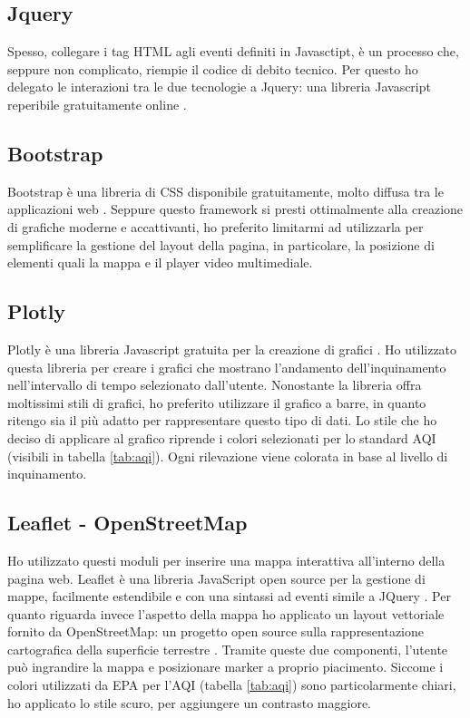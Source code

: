 \subsection{Jquery}
Spesso, collegare i tag HTML agli eventi definiti in Javasctipt, è un processo che, seppure non complicato, riempie il codice di debito tecnico.
Per questo ho delegato le interazioni tra le due tecnologie a Jquery: una libreria Javascript reperibile gratuitamente online \cite{jquery}.

\subsection{Bootstrap}
Bootstrap è una libreria di CSS disponibile gratuitamente, molto diffusa tra le applicazioni web \cite{bootstrap}.
Seppure questo framework si presti ottimalmente alla creazione di grafiche moderne e accattivanti, ho preferito limitarmi ad utilizzarla per semplificare la gestione del layout della pagina, in particolare,
la posizione di elementi quali la mappa e il player video multimediale.

\subsection{Plotly}
Plotly è una libreria Javascript gratuita per la creazione di grafici \cite{plotly}.
Ho utilizzato questa libreria per creare i grafici che mostrano l'andamento dell'inquinamento nell'intervallo di tempo selezionato dall'utente.
Nonostante la libreria offra moltissimi stili di grafici, ho preferito utilizzare il grafico a barre, in quanto ritengo sia il più adatto per rappresentare questo tipo di dati.
Lo stile che ho deciso di applicare al grafico riprende i colori selezionati per lo standard AQI (visibili in tabella \ref{tab:aqi}). Ogni rilevazione viene colorata in base al livello di inquinamento.

\subsection{Leaflet - OpenStreetMap}
Ho utilizzato questi moduli per inserire una mappa interattiva all'interno della pagina web.
Leaflet è una libreria JavaScript open source per la gestione di mappe, facilmente estendibile e con una sintassi ad eventi simile a JQuery \cite{leaflet}.
Per quanto riguarda invece l'aspetto della mappa ho applicato un layout vettoriale fornito da OpenStreetMap: un progetto open source sulla rappresentazione cartografica della superficie terrestre \cite{osm}.
Tramite queste due componenti, l'utente può ingrandire la mappa e posizionare marker a proprio piacimento.
Siccome i colori utilizzati da EPA per l'AQI (tabella \ref{tab:aqi}) sono particolarmente chiari, ho applicato lo stile scuro, per aggiungere un contrasto maggiore.

